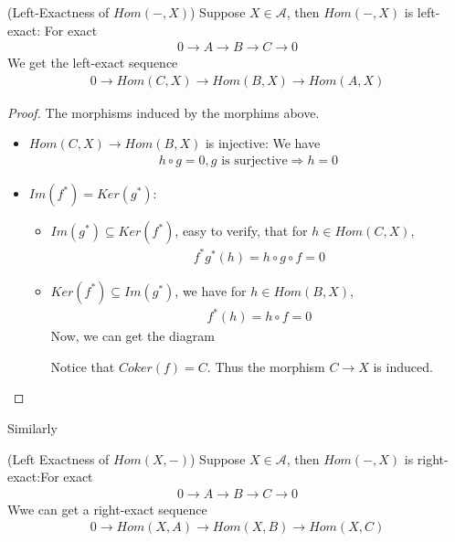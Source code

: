\documentclass[Total.tex]{subfiles}
\begin{document}
				\begin{proposition}
					(Left-Exactness of $Hom(-,X)$) Suppose $X\in \mathcal{A}$, then $Hom(-,X)$ is left-exact: For exact
					\begin{gather*}
						0\rightarrow A\rightarrow B\rightarrow C\rightarrow 0
					\end{gather*}
					We get the left-exact sequence
					\begin{gather*}
						0\rightarrow Hom(C,X)\rightarrow Hom(B,X)\rightarrow Hom(A,X)
					\end{gather*}
				\end{proposition}
				\begin{proof}
					The morphisms induced by the morphims above.
					\begin{itemize}
						\item $Hom(C,X)\rightarrow Hom(B,X)$ is injective: We have
						\begin{gather*}
							h\circ g=0,g\mbox{ is surjective}\Rightarrow h=0
						\end{gather*}
						\item $Im(f^*)=Ker(g^*)$: 
						\begin{itemize}
							\item $Im(g^*)\subseteq Ker(f^*)$, easy to verify, that for $h\in Hom(C,X)$,
							\begin{gather*}
								f^*g^*(h)=h\circ g\circ f=0
							\end{gather*}
							\item $Ker(f^*)\subseteq Im(g^*)$, we have for $h\in Hom(B,X)$,
							\begin{gather*}
								f^*(h)=h\circ f=0
							\end{gather*}
							Now, we can get the diagram
							\begin{center}
							\end{center}
							Notice that $Coker(f)=C$. Thus the morphism $C\rightarrow X$ is induced.
						\end{itemize}
					\end{itemize}
				\end{proof}
				Similarly
				\begin{proposition}
					(Left Exactness of $Hom(X,-)$) Suppose $X\in \mathcal{A}$, then $Hom(-,X)$ is right-exact:For exact
					\begin{gather*}
						0\rightarrow A\rightarrow B\rightarrow C\rightarrow 0
					\end{gather*}
					Wwe can get a right-exact sequence
					\begin{gather*}
						0\rightarrow Hom(X,A)\rightarrow Hom(X,B)\rightarrow Hom(X,C)
					\end{gather*}
				\end{proposition}
\end{document}
